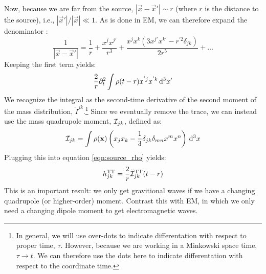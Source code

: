 Now, because we are far from the source, $|\vec{x} - \vec{x}'| \sim r$ (where $r$ is the distance to the source), i.e., $|\vec{x}'|/|\vec{x}| \ll 1$. As is done in \ac{EM}, we can therefore expand the denominator \cite{ref:BlanfordThorne}:
\begin{equation}
\label{eqn:expansion}
\frac{1}{|\vec{x} - \vec{x}'|} = \frac{1}{r} + \frac{x^{j}x^{j'}}{r^3} + \frac{x^j x^k (3x^{j'}x^{k'} - r^{'2}\delta_{jk})}{2r^5} + \ldots
\end{equation}
Keeping the first term yields:
\begin{equation*}
\frac{2}{r} \partial_t^2 \int \rho(t - r) x^{'j}x^{'k} \,\mathrm{d}^3 x'
\end{equation*}
We recognize the integral as the second-time derivative of the second moment of the mass distribution, $\ddot{I}^{jk}$.\footnote{In general, we will use over-dots to indicate differentation with respect to proper time, $\tau$. However, because we are working in a Minkowski space time, $\tau \rightarrow t$. We can therefore use the dots here to indicate differentation with respect to the coordinate time.} Since we eventually remove the trace, we can instead use the mass quadrupole moment, $\mathcal{I}_{jk}$, defined as:
\begin{equation}
\label{eqn:quad_moment}
\qI_{jk} = \int \rho(\mathbf{x})\left( x_j x_k - \frac{1}{3} \delta_{jk} \delta_{mn} x^{m} x^{n} \right) \d^3 x
\end{equation}
Plugging this into equation \ref{eqn:source_rho} yields:
\begin{equation}
\label{eqn:h_mass_quad}
h^{\TT}_{jk} = \frac{2}{r} \ddot{\qI}_{jk}^\TT(t - r)
\end{equation}
This is an important result: we only get gravitional waves if we have a changing quadrupole (or higher-order) moment. Contrast this with \ac{EM}, in which we only need a changing dipole moment to get electromagnetic waves.

